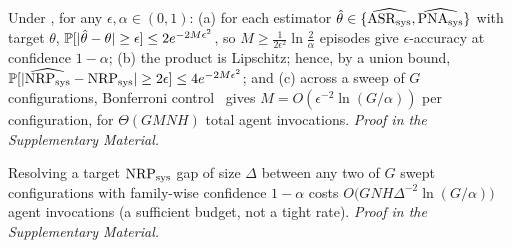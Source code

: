 \begin{theorem}
\label{thm:sample}
Under , for any $\epsilon,\alpha\in(0,1)$: (a) for each
estimator $\hat\theta\in\{\widehat{\mathrm{ASR}_{\mathrm{sys}}},\widehat{\mathrm{PNA}_{\mathrm{sys}}}\}$ with target $\theta$,
$\mathbb{P}[|\hat\theta-\theta|\ge\epsilon]\le 2e^{-2M\epsilon^{2}}$, so $M\ge\frac{1}{2\epsilon^{2}}
\ln\frac{2}{\alpha}$ episodes give $\epsilon$-accuracy at confidence $1-\alpha$;
(b) the product is Lipschitz; hence, by a union bound, $\mathbb{P}[|\widehat{\mathrm{NRP}_{\mathrm{sys}}}-\mathrm{NRP}_{\mathrm{sys}}|\ge
2\epsilon]\le 4e^{-2M\epsilon^{2}}$;
and (c) across a sweep of $G$ configurations, Bonferroni control~\cite{benjamini1995controlling}
gives $M=O(\epsilon^{-2}\ln(G/\alpha))$ per configuration, for $\Theta(GMNH)$ total agent
invocations. \emph{Proof in the Supplementary Material.}
\end{theorem}

\begin{corollary}
\label{cor:budget}
Resolving a target $\mathrm{NRP}_{\mathrm{sys}}$ gap of size $\Delta$ between any two of $G$ swept
configurations with family-wise confidence $1-\alpha$ costs
$O\bigl(GNH\Delta^{-2}\ln(G/\alpha)\bigr)$ agent invocations (a sufficient budget, not a
tight rate). \emph{Proof in the Supplementary Material.}
\end{corollary}

